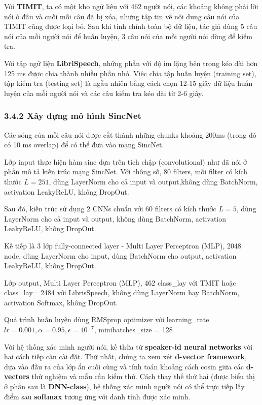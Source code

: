 \documentclass{article}
\begin{document}
	Với \textbf{TIMIT}, ta có một kho ngữ liệu với 462 người nói, các khoảng không phải lời nói ở đầu và cuối mỗi câu đã bị xóa, những tập tin về nội dung câu nói của TIMIT cũng được loại bỏ. Sau khi tinh chỉnh toàn bộ dữ liệu, tác giả dùng 5 câu nói của mỗi người nói để huấn luyện, 3 câu nói của mỗi người nói dùng để kiểm tra.
	
	Với tập ngữ liệu \textbf{LibriSpeech}, những phần với độ im lặng bên trong kéo dài hơn 125 ms được chia thành nhiều phần nhỏ. Việc chia tập huấn luyện (training set), tập kiểm tra (testing set) là ngẫu nhiên bằng cách chọn 12-15 giây dữ liệu huấn luyện của mỗi người nói và các câu kiểm tra kéo dài từ 2-6 giây. 
	
	\subsubsection{3.4.2 Xây dựng mô hình SincNet}
	\qquad Các sóng của mỗi câu nói được cắt thành những chunks khoảng 200ms (trong đó có 10 ms overlap) để có thể đưa vào mạng SincNet.
	
	Lớp input thực hiện hàm sinc dựa trên tích chập (convolutional) như đã nói ở phần mô tả kiến trúc mạng SincNet. Với thông số, 80 filters, mỗi filter có kích thước $L = 251$, dùng LayerNorm cho cả input và output,không dùng BatchNorm, activation LeakyReLU, không DropOut.
		
	Sau đó, kiến trúc sử dụng 2 CNNs chuẩn với 60 filters có kích thước $L = 5$, dùng LayerNorm cho cả input và output, không dùng BatchNorm, activation LeakyReLU, không DropOut.
	
	Kế tiếp là 3 lớp fully-connected layer - Multi Layer Perceptron (MLP), 2048 node, dùng LayerNorm cho input, dùng BatchNorm cho output, activation LeakyReLU, không DropOut.
	
	Lớp output, Multi Layer Perceptron (MLP), 462 class\_lay với TMIT hoặc class\_lay= 2484 với LibrisSpeech, không dùng LayerNorm hay BatchNorm, activation Softmax, không DropOut.
	
	Quá trình huấn luyện dùng RMSprop optimizer với learning\_rate $lr = 0.001, \alpha = 0.95, \epsilon = 10^{-7}$, minibatches\_size = 128
	
	Với hệ thống xác minh người nói, kế thừa từ \textbf{speaker-id neural networks} với hai cách tiếp cận cài đặt. Thứ nhất, chúng ta xem xét \textbf{d-vector framework}, dựa vào đầu ra của lớp ẩn cuối cùng và tính toán khoảng cách cosin giữa các \textbf{d-vectors} thử nghiệm và mẫu cần kiểm thử. Cách thay thế thứ hai (được biểu thị ở phần sau là \textbf{DNN-class}), hệ thống xác minh người nói có thể trực tiếp lấy điểm sau \textbf{softmax} tương ứng với danh tính được xác minh.
	
\end{document}
